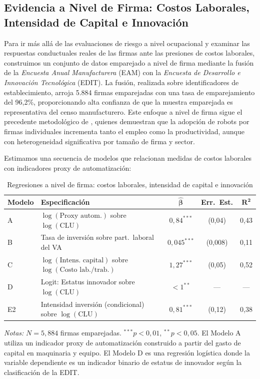 \documentclass{article}
\begin{document}
\subsection{Evidencia a Nivel de Firma: Costos Laborales, Intensidad de Capital e Innovaci\'on}
\label{subsec:firm_results}

Para ir m\'as all\'a de las evaluaciones de riesgo a nivel ocupacional y examinar las respuestas conductuales reales de las firmas ante las presiones de costos laborales, construimos un conjunto de datos emparejado a nivel de firma mediante la fusi\'on de la \textit{Encuesta Anual Manufacturera} (EAM) con la \textit{Encuesta de Desarrollo e Innovaci\'on Tecnol\'ogica} (EDIT). La fusi\'on, realizada sobre identificadores de establecimiento, arroja 5.884 firmas emparejadas con una tasa de emparejamiento del 96,2\%, proporcionando alta confianza de que la muestra emparejada es representativa del censo manufacturero. Este enfoque a nivel de firma sigue el precedente metodol\'ogico de \cite{koch2021}, quienes demuestran que la adopci\'on de robots por firmas individuales incrementa tanto el empleo como la productividad, aunque con heterogeneidad significativa por tama\~no de firma y sector.

Estimamos una secuencia de modelos que relacionan medidas de costos laborales con indicadores proxy de automatizaci\'on:

\begin{table}[htbp]
\centering
\caption{Regresiones a nivel de firma: costos laborales, intensidad de capital e innovaci\'on}
\label{tab:firm_results}
\begin{threeparttable}
\begin{tabular}{llccc}
\toprule
\textbf{Modelo} & \textbf{Especificaci\'on} & $\boldsymbol{\hat{\beta}}$ & \textbf{Err.\ Est.} & $\boldsymbol{R^2}$ \\
\midrule
A & $\log(\text{Proxy autom.})$ sobre $\log(\text{CLU})$ & $0{,}84^{***}$ & (0,04) & 0,43 \\
B & Tasa de inversi\'on sobre part.\ laboral del VA & $0{,}045^{***}$ & (0,008) & 0,11 \\
C & $\log(\text{Intens.\ capital})$ sobre $\log(\text{Costo lab./trab.})$ & $1{,}27^{***}$ & (0,05) & 0,52 \\
\midrule
D & Logit: Estatus innovador sobre $\log(\text{CLU})$ & $<1^{**}$ & --- & --- \\
E2 & Intensidad inversi\'on (condicional) sobre $\log(\text{CLU})$ & $0{,}81^{***}$ & (0,12) & 0,38 \\
\bottomrule
\end{tabular}
\begin{tablenotes}
\small
\item \textit{Notas:} $N = 5{,}884$ firmas emparejadas. $^{***}p<0{,}01$, $^{**}p<0{,}05$. El Modelo A utiliza un indicador proxy de automatizaci\'on construido a partir del gasto de capital en maquinaria y equipo. El Modelo D es una regresi\'on log\'istica donde la variable dependiente es un indicador binario de estatus de innovador seg\'un la clasificaci\'on de la EDIT.
\end{tablenotes}
\end{threeparttable}
\end{table}
\end{document}

